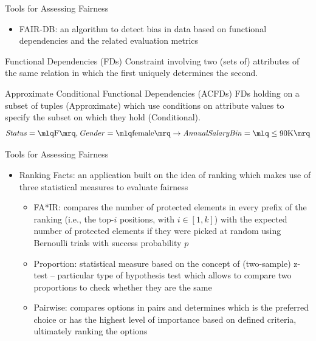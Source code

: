 \documentclass[usenames,dvipsnames]{beamer}
\begin{document}
    
    \begin{frame}{Tools for Assessing Fairness}
        \begin{itemize}
            \item \alert{FAIR-DB}: an algorithm to detect bias in data based on \textcolor{defaultBlue}{functional dependencies} and the related evaluation metrics \emph{\parencite{azzalini2021fair}}
        \end{itemize}
        \begin{block}{Functional Dependencies (FDs)}
            Constraint involving two (sets of) attributes of the same relation in which the first {uniquely determines} the second.
        \end{block}
        \begin{block}{Approximate Conditional Functional Dependencies (ACFDs)}
            FDs holding on a subset of tuples (Approximate) which use conditions on attribute values to specify the subset on which they hold (Conditional).
            \[\mathit{Status} = \mlq \mathrm{F} \mrq, \mathit{Gender} = \mlq \mathrm{female} \mrq \rightarrow \mathit{Annual Salary Bin} = \mlq \leq \mathrm{90K} \mrq\]
        \end{block}
    \end{frame}
    
    
    \begin{frame}{Tools for Assessing Fairness}
        \begin{itemize}
            \item \alert{Ranking Facts}: an application built on the idea of \textcolor{defaultBlue}{ranking} which makes use of three statistical measures to evaluate fairness \emph{\parencite{yang2018nutritional}}
            \begin{itemize}
                \item \textcolor{defaultBlue}{FA*IR}: compares the number of protected elements in every prefix of the ranking (i.e., the top-\(i\) positions, with \(i \in [1, k]\)) with the expected number of protected elements if they were picked at random using Bernoulli trials with success probability \(p\)
                \item \textcolor{defaultBlue}{Proportion}: statistical measure based on the concept of {(two-sample) z-test} -- particular type of hypothesis test which allows to compare two proportions to check whether they are the same
                \item \textcolor{defaultBlue}{Pairwise}: compares options in pairs and determines which is the preferred choice or has the highest level of importance based on defined criteria, ultimately ranking the options
            \end{itemize}
        \end{itemize}
    \end{frame}
    
\end{document}
